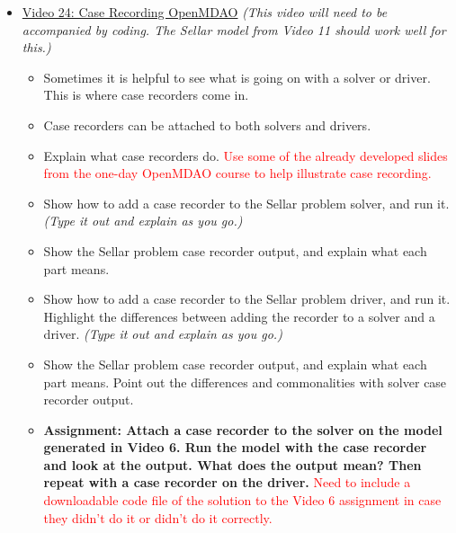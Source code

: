 \documentclass[12pt, letterpaper]{article}
\begin{document}
\begin{itemize}
	\item \underline{Video 24: Case Recording OpenMDAO} \textit{(This video will need to be accompanied by coding. The Sellar model from Video 11 should work well for this.)}
		\begin{itemize}
			\item Sometimes it is helpful to see what is going on with a solver or driver. This is where case recorders come in.
			\item Case recorders can be attached to both solvers and drivers.
			\item Explain what case recorders do. \textcolor{red}{Use some of the already developed slides from the one-day OpenMDAO course to help illustrate case recording.}
			\item Show how to add a case recorder to the Sellar problem solver, and run it. \textit{(Type it out and explain as you go.)}
			\item Show the Sellar problem case recorder output, and explain what each part means.
			\item Show how to add a case recorder to the Sellar problem driver, and run it. Highlight the differences between adding the recorder to a solver and a driver. \textit{(Type it out and explain as you go.)}
			\item Show the Sellar problem case recorder output, and explain what each part means. Point out the differences and commonalities with solver case recorder output.
			\item \textbf{Assignment: Attach a case recorder to the solver on the model generated in Video 6. Run the model with the case recorder and look at the output. What does the output mean? Then repeat with a case recorder on the driver.} \textcolor{red}{Need to include a downloadable code file of the solution to the Video 6 assignment in case they didn't do it or didn't do it correctly.}
		\end{itemize}
		

\end{itemize}
\end{document}
